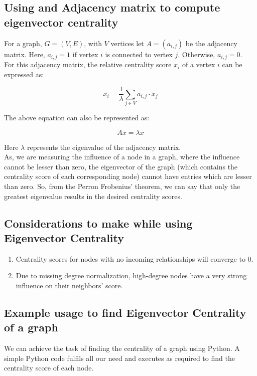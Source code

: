 \documentclass{article}
\begin{document}
    \subsection{Using and Adjacency matrix to compute eigenvector centrality}
    For a graph, $G = (V, E)$, with $V$ vertices let $A = (a_{i, j})$ be the adjacency matrix. Here, $a_{i, j} = 1$ if vertex $i$ is connected to vertex $j$. Otherwise, $a_{i, j} = 0$.\\

    \noindent For this adjacency matrix, the relative centrality score $x_i$ of a vertex $i$ can be expressed as:

    \[x_i = \frac{1}{\lambda} \sum_{j \in V} a_{i, j} \cdot x_j\]

    \noindent The above equation can also be represented as:

    \[Ax = \lambda x\]

    \noindent Here $\lambda$ represents the eigenvalue of the adjacency matrix.\\

    \noindent As, we are measuring the influence of a node in a graph, where the influence cannot be lesser than zero, the eigenvector of the graph (which contains the centrality score of each corresponding node) cannot have entries which are lesser than zero. So, from the Perron Frobenius' theorem, we can say that only the greatest eigenvalue results in the desired centrality scores.
    
    \subsection{Considerations to make while using Eigenvector Centrality}
    \begin{enumerate}
        \item Centrality scores for nodes with no incoming relationships will converge to 0.
        \item Due to missing degree normalization, high-degree nodes have a very strong influence on their neighbors' score.
    \end{enumerate}

    \subsection{Example usage to find Eigenvector Centrality of a graph}
    We can achieve the task of finding the centrality of a graph using Python. A simple Python code fulfils all our need and executes as required to find the centrality score of each node.\\
\end{document}
